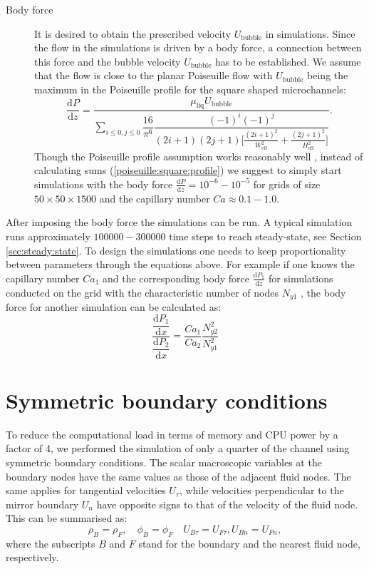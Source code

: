 \documentclass{article}
\begin{document}
\begin{description}
\item[Body force] 
It is desired to obtain the prescribed velocity $U_{\mathrm{bubble}}$ in simulations. Since the
flow in the simulations is driven by a body force, a connection between this force and the
bubble velocity $U_{\mathrm{bubble}}$ has to be established. We assume that the
flow is close to the planar Poiseuille flow with $U_{\mathrm{bubble}}$ being the maximum in the
Poiseuille profile for the square shaped microchannels:
\begin{equation}
\label{poiseuille:square:profile}
\dfrac{\mathrm{d}P}{\mathrm{d}z}=\frac{\mu_{\mathrm{liq}} U_{\mathrm{bubble}}}{\sum_{i\leq 0,j\leq
0}{\dfrac{16}{\pi^6} \dfrac{(-1)^i (-1)^j}{(2 i+1)(2 j+1)\bigl[\frac{(2 i
+1)^2}{W_{\mathrm{eff}}^2}+\frac{(2 j+1)^2}{H_{\mathrm{eff}}^2}\bigr]}}}.
\end{equation}
Though the Poiseuille profile assumption works reasonably well \cite{kuzmin-binary2d}, instead of
calculating sums (\ref{poiseuille:square:profile}) we suggest to simply start simulations with the
body force $\frac{\mathrm{d}P}{\mathrm{d}z}=10^{-6}-10^{-5}$ for grids of size $50\times 50 \times
1500$ and the capillary number $Ca\approx0.1-1.0$.  
\end{description}
After imposing the body force the simulations can be run. A typical simulation runs approximately
$100000-300000$ time steps to reach steady-state, see Section \ref{sec:steady:state}. To design the
simulations one needs to keep proportionality between parameters through the equations above. For
example if one knows the capillary number $Ca_1$ and the corresponding body force
$\frac{\mathrm{d}P_1}{\mathrm{d}z}$ for simulations conducted on the grid with the characteristic
number of nodes $N_{y1}$ , the body force for another simulation can be calculated as:
\begin{equation}
\dfrac{\dfrac{\mathrm{d}P_1}{\mathrm{d}x}}{\dfrac{\mathrm{d}P_2}{\mathrm{d}x}}=\frac{Ca_1}{Ca_2}
\frac{N_{
y2}^2 }{N_{y1}^2}
\end{equation}

\section{Symmetric boundary conditions}
\label{append:sym}
To reduce the computational load in terms of memory and CPU power by a factor of 4, we performed the simulation of 
only a quarter of the channel using symmetric boundary conditions.  The scalar macroscopic variables
at the boundary nodes have the same values as those of the adjacent fluid nodes.  The same applies
for tangential velocities $U_{\tau}$, while velocities perpendicular  to the mirror boundary $U_n$ have opposite signs
to that of the velocity of the fluid node.  This can be summarised as:
\begin{equation}
\rho_B = \rho_F, \quad \phi_B = \phi_F \quad U_{B\tau}=U_{F\tau}, U_{B n}=U_{F n}, 
\end{equation}
where the subscripts $B$ and $F$ stand for the boundary and the nearest fluid node, respectively.
\end{document}
